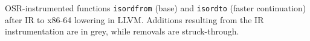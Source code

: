 \label{fig:isordx86-64} OSR-instrumented functions {\tt isordfrom} (base) and {\tt isordto} (faster continuation) after IR to x86-64 lowering in LLVM. %
Additions resulting from the IR instrumentation are in grey, while removals are struck-through.